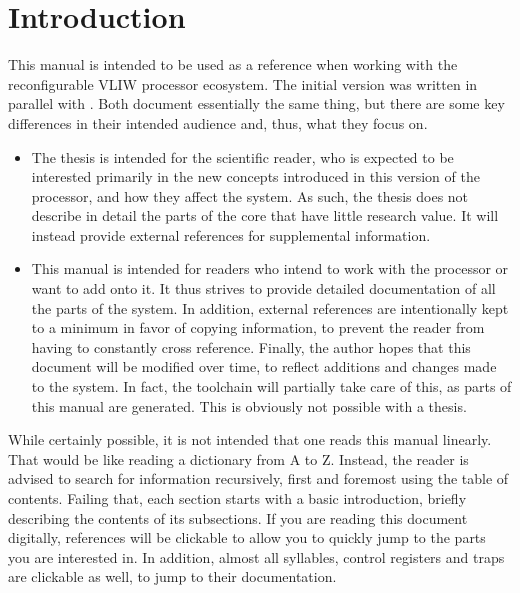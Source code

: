 
\chapter{Introduction}
\label{sec:introduction}

This manual is intended to be used as a reference when working with the \rvex{} 
reconfigurable VLIW processor ecosystem. The initial version was written in 
parallel with \cite{vanstraten2016}. Both document essentially the same thing, 
but there are some key differences in their intended audience and, thus, what 
they focus on.

\begin{itemize}

\item The thesis is intended for the scientific reader, who is expected to be
interested primarily in the new concepts introduced in this version of the
\rvex{} processor, and how they affect the system. As such, the thesis does not
describe in detail the parts of the \rvex{} core that have little research
value. It will instead provide external references for supplemental information.

\item This manual is intended for readers who intend to work with the \rvex{} 
processor or want to add onto it. It thus strives to provide detailed 
documentation of all the parts of the system. In addition, external references 
are intentionally kept to a minimum in favor of copying information, to prevent 
the reader from having to constantly cross reference. Finally, the author hopes 
that this document will be modified over time, to reflect additions and changes 
made to the system. In fact, the toolchain will partially take care of this, as
parts of this manual are generated. This is obviously not possible with a
thesis.

\end{itemize}

\noindent While certainly possible, it is not intended that one reads this 
manual linearly. That would be like reading a dictionary from A to Z. Instead,
the reader is advised to search for information recursively, first and foremost
using the table of contents. Failing that, each section starts with a basic
introduction, briefly describing the contents of its subsections. If you are
reading this document digitally, references will be clickable to allow you to
quickly jump to the parts you are interested in. In addition, almost all
syllables, control registers and traps are clickable as well, to jump to their
documentation.

